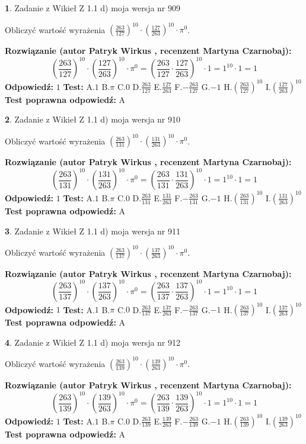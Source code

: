 \documentclass[12pt, a4paper]{article}
\theoremstyle{definition} %
\newtheorem{zad}{}
\newcommand{\zadStart}[1]{\begin{zad}#1\newline}
\newcommand{\zadStop}{\end{zad}}
\newcommand{\rozwStart}[2]{\noindent \textbf{Rozwiązanie (autor #1 , recenzent #2): }\newline}
\newcommand{\rozwStop}{\newline}
\newcommand{\odpStart}{\noindent \textbf{Odpowiedź:}\newline}
\newcommand{\odpStop}{\newline}
\newcommand{\testStart}{\noindent \textbf{Test:}\newline}
\newcommand{\testStop}{\newline}
\newcommand{\kluczStart}{\noindent \textbf{Test poprawna odpowiedź:}\newline}
\newcommand{\kluczStop}{\newline}
\begin{document}
\zadStart{Zadanie z Wikieł Z 1.1 d) moja wersja nr 909}

Obliczyć wartość wyrażenia $(\frac{263}{127})^{10} \cdot (\frac{127}{263})^{10} \cdot \pi^{0}$.
\zadStop
\rozwStart{Patryk Wirkus}{Martyna Czarnobaj}
$$(\frac{263}{127})^{10} \cdot (\frac{127}{263})^{10} \cdot \pi^{0} = (\frac{263}{127} \cdot \frac{127}{263})^{10} \cdot 1 = 1^{10} \cdot 1 = 1$$
\rozwStop
\odpStart
$1$
\odpStop
\testStart
A.$1$ B.$\pi$ C.$0$ D.$\frac{263}{127}$ E.$\frac{127}{263}$
F.$-\frac{263}{127}$ G.$-1$
H.$(\frac{263}{127})^{10}$
I.$(\frac{127}{263})^{10}$
\testStop
\kluczStart
A
\kluczStop



\zadStart{Zadanie z Wikieł Z 1.1 d) moja wersja nr 910}

Obliczyć wartość wyrażenia $(\frac{263}{131})^{10} \cdot (\frac{131}{263})^{10} \cdot \pi^{0}$.
\zadStop
\rozwStart{Patryk Wirkus}{Martyna Czarnobaj}
$$(\frac{263}{131})^{10} \cdot (\frac{131}{263})^{10} \cdot \pi^{0} = (\frac{263}{131} \cdot \frac{131}{263})^{10} \cdot 1 = 1^{10} \cdot 1 = 1$$
\rozwStop
\odpStart
$1$
\odpStop
\testStart
A.$1$ B.$\pi$ C.$0$ D.$\frac{263}{131}$ E.$\frac{131}{263}$
F.$-\frac{263}{131}$ G.$-1$
H.$(\frac{263}{131})^{10}$
I.$(\frac{131}{263})^{10}$
\testStop
\kluczStart
A
\kluczStop



\zadStart{Zadanie z Wikieł Z 1.1 d) moja wersja nr 911}

Obliczyć wartość wyrażenia $(\frac{263}{137})^{10} \cdot (\frac{137}{263})^{10} \cdot \pi^{0}$.
\zadStop
\rozwStart{Patryk Wirkus}{Martyna Czarnobaj}
$$(\frac{263}{137})^{10} \cdot (\frac{137}{263})^{10} \cdot \pi^{0} = (\frac{263}{137} \cdot \frac{137}{263})^{10} \cdot 1 = 1^{10} \cdot 1 = 1$$
\rozwStop
\odpStart
$1$
\odpStop
\testStart
A.$1$ B.$\pi$ C.$0$ D.$\frac{263}{137}$ E.$\frac{137}{263}$
F.$-\frac{263}{137}$ G.$-1$
H.$(\frac{263}{137})^{10}$
I.$(\frac{137}{263})^{10}$
\testStop
\kluczStart
A
\kluczStop



\zadStart{Zadanie z Wikieł Z 1.1 d) moja wersja nr 912}

Obliczyć wartość wyrażenia $(\frac{263}{139})^{10} \cdot (\frac{139}{263})^{10} \cdot \pi^{0}$.
\zadStop
\rozwStart{Patryk Wirkus}{Martyna Czarnobaj}
$$(\frac{263}{139})^{10} \cdot (\frac{139}{263})^{10} \cdot \pi^{0} = (\frac{263}{139} \cdot \frac{139}{263})^{10} \cdot 1 = 1^{10} \cdot 1 = 1$$
\rozwStop
\odpStart
$1$
\odpStop
\testStart
A.$1$ B.$\pi$ C.$0$ D.$\frac{263}{139}$ E.$\frac{139}{263}$
F.$-\frac{263}{139}$ G.$-1$
H.$(\frac{263}{139})^{10}$
I.$(\frac{139}{263})^{10}$
\testStop
\kluczStart
A
\kluczStop
\end{document}
